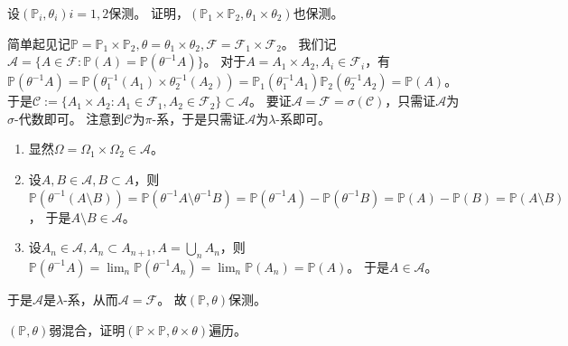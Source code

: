 \documentclass{ctexart}
\newif\ifpreface
\begin{document}
\large
\setlength{\baselineskip}{1.2em}
\ifpreface

\newgeometry{left=2cm,right=2cm,top=2cm,bottom=2cm}
\else
{}
\maketitle
\fi
\begin{problem}\label{pro:1}
  设\((\mathbb{P}_i,\theta_i)i = 1,2 \)保测。
  证明，\((\mathbb{P}_1 \times \mathbb{P}_2,\theta_1 \times \theta_{2}) \)也保测。
\end{problem}
\begin{solution}
  简单起见记\(\mathbb{P} = \mathbb{P}_1 \times \mathbb{P}_2,\theta = \theta_1 \times \theta_2,\mathcal{F} = \mathcal{F}_1 \times \mathcal{F}_{2} \)。
  我们记\(\mathcal{A} = \{A \in \mathcal{F}:\mathbb{P}(A) = \mathbb{P}(\theta ^{-1} A)\} \)。
  对于\(A = A_{1} \times A_{2},A_i \in \mathcal{F}_i \)，有
  \(\mathbb{P}(\theta ^{-1} A) = \mathbb{P}(\theta_1^{-1}(A_{1})\times \theta_2^{-1}(A_{2})) = \mathbb{P}_1(\theta_1^{-1} A_{1})\mathbb{P}_2(\theta_2^{-1}A_{2}) = \mathbb{P}(A) \)。
  于是\(\mathcal{C}:=\{A_{1} \times A_{2}:A_{1} \in \mathcal{F}_1,A_{2} \in \mathcal{F}_{2}\} \subset \mathcal{A} \)。
  要证\(\mathcal{A} = \mathcal{F} = \sigma(\mathcal{C})\)，只需证\(\mathcal{A} \)为\(\sigma \)-代数即可。
  注意到\(\mathcal{C} \)为\(\pi \)-系，于是只需证\(\mathcal{A} \)为\(\lambda \)-系即可。
  \begin{enumerate}
    \item 显然\(\Omega = \Omega_1 \times \Omega_2 \in \mathcal{A} \)。
    \item 设\(A,B \in \mathcal{A},B \subset A \)，则\(\mathbb{P}(\theta ^{-1} (A \setminus B)) = \mathbb{P}( \theta ^{-1} A \setminus \theta ^{-1} B) = \mathbb{P}(\theta ^{-1} A) - \mathbb{P}(\theta ^{-1} B) = \mathbb{P}(A)-\mathbb{P}(B) = \mathbb{P}(A \setminus B) \)，
      于是\(A\setminus B \in \mathcal{A} \)。
    \item 设\(A_n \in \mathcal{A},A_n \subset A_{n + 1},A = \bigcup_{n}A_n \)，则\(\mathbb{P}(\theta ^{-1} A) = \lim_{n}\mathbb{P}(\theta ^{-1}A_n) = \lim_{n}\mathbb{P}(A_n) = \mathbb{P}(A) \)。
      于是\(A \in \mathcal{A} \)。
  \end{enumerate}
  于是\(\mathcal{A} \)是\(\lambda \)-系，从而\(\mathcal{A} = \mathcal{F} \)。
  故\((\mathbb{P},\theta) \)保测。
\end{solution}
\begin{problem}\label{pro:2}
  \((\mathbb{P},\theta) \)弱混合，证明\((\mathbb{P} \times \mathbb{P},\theta \times \theta) \)遍历。
\end{problem}
\end{document}
